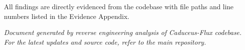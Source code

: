\documentclass[10pt,a4paper]{article}
\begin{document}
All findings are directly evidenced from the codebase with file paths and line numbers listed in the Evidence Appendix.

\vspace{1cm}
\begin{center}
\textit{Document generated by reverse engineering analysis of Caduceus-Flux codebase.}\\
\textit{For the latest updates and source code, refer to the main repository.}
\end{center}
\end{document}
